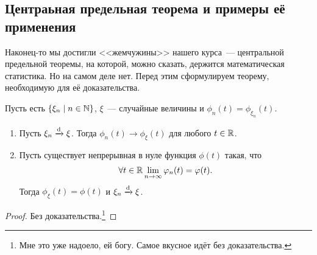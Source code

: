 \subsection{Центраьная предельная теорема и примеры её применения}
Наконец-то мы достигли <<жемчужины>> нашего курса~--- центральной предельной теоремы, на которой, можно сказать, держится математическая статистика. Но на самом деле нет. Перед этим сформулируем теорему, необходимую для её доказательства.
\begin{theorem}[непрерывности]
	Пусть есть \(\{\xi_{n} \mid n \in \mathbb{N}\}\), \(\xi\)~--- случайные величины и \(\phi_{n}(t) = \phi_{\xi_n}(t)\).
	\begin{enumerate}
		\item Пусть \(\xi_{n} \xrightarrow{\mathrm{d}} \xi\). Тогда \(\phi_{n}(t) \to \phi_{\xi}(t)\) для любого \(t \in \mathbb{R}\).
		\item Пусть существует непрерывная в нуле функция \(\phi(t)\) такая, что
		\[
			\forall t \in \mathbb{R} \lim\limits_{n \to \infty} \varphi_{n}(t) = \varphi(t).
		\]
		Тогда \(\phi_{\xi}(t) = \phi(t)\) и \(\xi_{n} \xrightarrow{\mathrm{d}} \xi\).
	\end{enumerate}
\end{theorem}
\begin{proof}
	Без доказательства.\footnote{Мне это уже надоело, ей богу. Самое вкусное идёт без доказательства.}
\end{proof}

